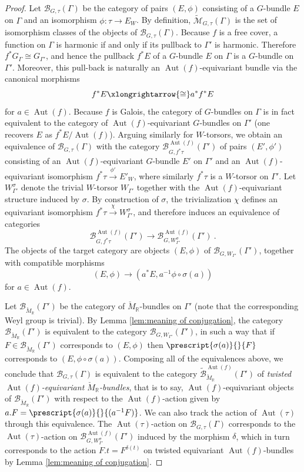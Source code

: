 \documentclass[10pt, a4paper]{amsart}
\theoremstyle{definition}
\theoremstyle{myitemstyle}
\newcommand{\R}{\mathbb{R}}
\newcommand{\RR}{\mathbb{R}}
\newcommand{\Mcheck}{{\check{M}}}
\newcommand{\mc}[1]{{\mathcal{#1}}}
\newcommand{\wmc}[1]{{\widetilde{\mathcal{#1}}}}
\DeclareMathOperator{\Aut}{Aut}
\newcommand{\Ga}{\Gamma}
\begin{document}
\begin{proof}
Let $\mc B_{G,\tau}(\Gamma)$ be the category of pairs $(E, \phi)$ consisting of a $G$-bundle $E$ on $\Ga$ and an isomorphism $\phi\colon \tau \to E_W$. By definition, $\wmc M_{G,\tau}(\Gamma)$ is the set of isomorphism classes of the objects of $\mc B_{G,\tau}(\Gamma)$.
Because $f$ is a free cover, a function on $\Ga$ is harmonic if and only if its pullback to $\Ga'$ is harmonic. Therefore $f^{*}G_{\Gamma}\cong G_{\Gamma'}$, and hence the pullback $f^{*}E$ of a $G$-bundle $E$ on $\Gamma$ is a $G$-bundle on $\Gamma'$. Moreover, this pull-back is naturally an $\Aut(f)$-equivariant bundle via the canonical morphisms
\[
    f^{*}E \xlongrightarrow{\cong} a^{*}f^{*}E
\]
for $a\in\Aut(f)$. Because $f$ is Galois, the category of $G$-bundles on $\Gamma$ is in fact equivalent to the category of $\Aut(f)$-equivariant $G$-bundles on $\Gamma'$ (one recovers $E$ as $f^{*}E/\Aut(f)$). Arguing similarly for $W$-torsors, we obtain an equivalence of $\mc B_{G,\tau}(\Gamma)$ with the category $\mc B^{\Aut(f)}_{G,f^{*}\tau}(\Gamma')$ of pairs $(E',\phi')$ consisting of an $\Aut(f)$-equivariant $G$-bundle $E'$ on $\Ga'$ and an $\Aut(f)$-equivariant isomorphism $f^{*}\tau \xrightarrow{\phi'} E'_W$, where similarly $f^{*}\tau$ is a $W$-torsor on $\Ga'$. Let $W_{\Gamma'}^\sigma$ denote the trivial $W$-torsor $W_{\Gamma'}$ together with the $\Aut(f)$-equivariant structure induced by $\sigma$. By construction of $\sigma$, the trivialization $\chi$ defines an equivariant isomorphism $f^{*}\tau\xrightarrow{\chi} W_{\Gamma'}^\sigma$, and therefore induces an equivalence of categories
\[
\mc B^{\Aut(f)}_{G,f^{*}\tau}(\Gamma') \longrightarrow \mc B^{\Aut(f)}_{G,W_{\Gamma'}^\sigma}(\Gamma')  \ .
\]
The objects of the target category are objects $(E,\phi)$ of $\mc B_{G,W_{\Gamma'}}(\Gamma')$, together with compatible morphisms 
\[
    (E,\phi)\longrightarrow (a^{*}E, a^{-1}\phi\circ \sigma(a))
\]
for $a\in \Aut(f)$. 

Let $\mc B_{\Mcheck_\R}(\Gamma')$ be the category of $\Mcheck_\R$-bundles on $\Ga'$ (note that the corresponding Weyl group is trivial). By Lemma \ref{lem:meaning of conjugation}, the category $\mc B_{\Mcheck_\R}(\Gamma')$ is equivalent to the category $\mc B_{G,W_{\Gamma'}}(\Gamma')$, in such a way that if $F\in \mc B_{\Mcheck_\R}(\Gamma')$ corresponds to $(E,\phi)$ then $\prescript{\sigma(a)}{}{F}$ corresponds to $(E,\phi\circ \sigma(a))$. Composing all of the equivalences above, we conclude that $\mc B_{G,\tau}(\Gamma)$ is equivalent to the category $\wmc B_{\Mcheck_\R}^{\Aut(f)}(\Gamma')$ of \emph{twisted $\Aut(f)$-equivariant $\Mcheck_\RR$-bundles}, that is to say, $\Aut(f)$-equivariant objects of $\mc B_{\Mcheck_\R}(\Gamma')$ with respect to the $\Aut(f)$-action given by $a.F=\prescript{\sigma(a)}{}{(a^{-1}F)}$. We can also track the action of $\Aut(\tau)$ through this equivalence. The $\Aut(\tau)$-action on $\mc B_{G,\tau}(\Gamma)$ corresponds to the $\Aut(\tau)$-action on $\mc B^{\Aut(f)}_{G, W_{\Gamma'}^\sigma}(\Gamma')$ induced by the morphism $\delta$, which in turn corresponds to the action $F.t= F^{\delta(t)}$ on twisted equivariant $\Aut(f)$-bundles by Lemma \ref{lem:meaning of conjugation}. 


\end{proof}
\end{document}
